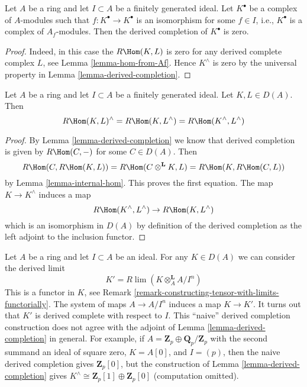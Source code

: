 \begin{lemma}
\label{lemma-derived-completion-vanishes}
Let $A$ be a ring and let $I \subset A$ be a finitely generated ideal.
Let $K^\bullet$ be a complex of $A$-modules such that
$f : K^\bullet \to K^\bullet$ is an isomorphism for some
$f \in I$, i.e., $K^\bullet$ is a complex of $A_f$-modules. Then
the derived completion of $K^\bullet$ is zero.
\end{lemma}

\begin{proof}
Indeed, in this case the $R\Hom(K, L)$ is zero for any derived complete
complex $L$, see
Lemma \ref{lemma-hom-from-Af}. Hence $K^\wedge$ is zero by the
universal property in Lemma \ref{lemma-derived-completion}.
\end{proof}

\begin{lemma}
\label{lemma-completion-RHom}
Let $A$ be a ring and let $I \subset A$ be a finitely generated ideal.
Let $K, L \in D(A)$. Then
$$
R\Hom(K, L)^\wedge = R\Hom(K, L^\wedge) = R\Hom(K^\wedge, L^\wedge)
$$
\end{lemma}

\begin{proof}
By Lemma \ref{lemma-derived-completion} we know that derived completion is
given by $R\Hom(C, -)$ for some $C \in D(A)$. Then
$$
R\Hom(C, R\Hom(K, L)) = R\Hom(C \otimes^\mathbf{L} K, L) =
R\Hom(K, R\Hom(C, L))
$$
by Lemma \ref{lemma-internal-hom}. This proves the first equation.
The map $K \to K^\wedge$ induces a map
$$
R\Hom(K^\wedge, L^\wedge) \to R\Hom(K, L^\wedge)
$$
which is an isomorphism in $D(A)$ by definition of the derived completion
as the left adjoint to the inclusion functor.
\end{proof}

\noindent
Let $A$ be a ring and let $I \subset A$ be an ideal. For any
$K \in D(A)$ we can consider the derived limit
$$
K' = R\lim (K \otimes_A^\mathbf{L} A/I^n)
$$
This is a functor in $K$, see
Remark \ref{remark-constructing-tensor-with-limits-functorially}.
The system of maps $A \to A/I^n$ induces a map $K \to K'$.
It turns out that $K'$ is derived complete with respect to $I$.
This ``naive'' derived completion construction does not agree
with the adjoint of Lemma \ref{lemma-derived-completion} in general.
For example, if $A = \mathbf{Z}_p \oplus \mathbf{Q}_p/\mathbf{Z}_p$
with the second summand an ideal of square zero, $K = A[0]$, and $I = (p)$,
then the naive derived completion gives $\mathbf{Z}_p[0]$, but the
construction of Lemma \ref{lemma-derived-completion} gives
$K^\wedge \cong \mathbf{Z}_p[1] \oplus \mathbf{Z}_p[0]$ (computation omitted).

